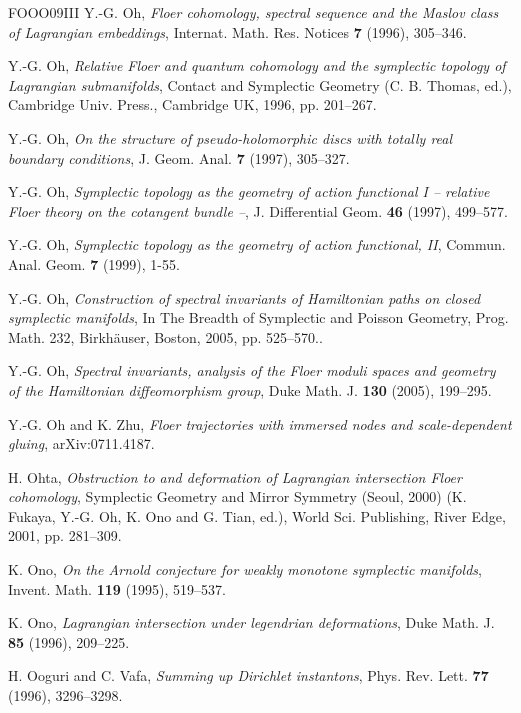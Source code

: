 \begin{thebibliography}{FOOO09III}
 Y.-G. Oh, \emph{Floer cohomology, spectral sequence and the Maslov class of Lagrangian embeddings}, Internat. Math. Res. Notices \textbf{7} (1996), 305–346.

 Y.-G. Oh, \emph{Relative Floer and quantum cohomology and the symplectic topology of Lagrangian submanifolds}, Contact and Symplectic Geometry (C. B. Thomas, ed.), Cambridge Univ. Press., Cambridge UK, 1996, pp. 201–267.

 Y.-G. Oh, \emph{On the structure of pseudo-holomorphic discs with totally real boundary conditions}, J. Geom. Anal. \textbf{7} (1997), 305–327.

 Y.-G. Oh, \emph{Symplectic topology as the geometry of action functional I – relative Floer theory on the cotangent bundle –}, J. Differential Geom. \textbf{46} (1997), 499–577.

 Y.-G. Oh, \emph{Symplectic topology as the geometry of action functional, II}, Commun. Anal. Geom. \textbf{7} (1999), 1-55.

 Y.-G. Oh, \emph{Construction of spectral invariants of Hamiltonian paths on closed symplectic manifolds}, In The Breadth of Symplectic and Poisson Geometry, Prog. Math. 232, Birkhäuser, Boston, 2005, pp. 525–570..

 Y.-G. Oh, \emph{Spectral invariants, analysis of the Floer moduli spaces and geometry of the Hamiltonian diffeomorphism group}, Duke Math. J. \textbf{130} (2005), 199–295.

 Y.-G. Oh and K. Zhu, \emph{Floer trajectories with immersed nodes and scale-dependent gluing}, arXiv:0711.4187.

 H. Ohta, \emph{Obstruction to and deformation of Lagrangian intersection Floer cohomology}, Symplectic Geometry and Mirror Symmetry (Seoul, 2000) (K. Fukaya, Y.-G. Oh, K. Ono and G. Tian, ed.), World Sci. Publishing, River Edge, 2001, pp. 281–309.

 K. Ono, \emph{On the Arnold conjecture for weakly monotone symplectic manifolds}, Invent. Math. \textbf{119} (1995), 519–537.

 K. Ono, \emph{Lagrangian intersection under legendrian deformations}, Duke Math. J. \textbf{85} (1996), 209–225.

 H. Ooguri and C. Vafa, \emph{Summing up Dirichlet instantons}, Phys. Rev. Lett. \textbf{77} (1996), 3296–3298.


\end{thebibliography}
